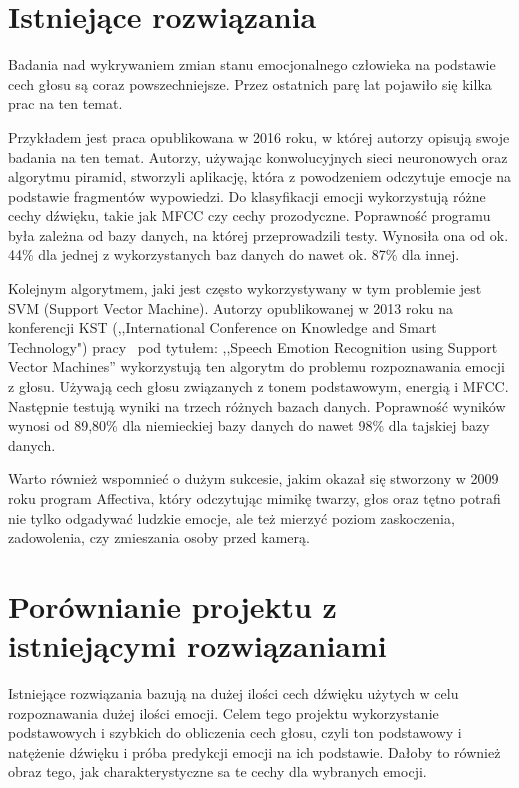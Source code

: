\documentclass[declaration,shortabstract]{iithesis}
\begin{document}
\section{Istniejące rozwiązania}
Badania nad wykrywaniem zmian stanu emocjonalnego człowieka na podstawie cech głosu są coraz powszechniejsze. Przez ostatnich parę lat pojawiło się kilka prac na ten temat. 

Przykładem jest praca\cite{sernn} opublikowana w 2016 roku, w której autorzy opisują swoje badania na ten temat. Autorzy, używając konwolucyjnych sieci neuronowych oraz algorytmu piramid, stworzyli aplikację, która z powodzeniem odczytuje emocje na podstawie fragmentów wypowiedzi. Do klasyfikacji emocji wykorzystują różne cechy dźwięku, takie jak MFCC czy cechy prozodyczne. Poprawność programu była zależna od bazy danych, na której przeprowadzili testy. Wynosiła ona od ok. 44\% dla jednej z wykorzystanych baz danych do nawet ok. 87\% dla innej.

Kolejnym algorytmem, jaki jest często wykorzystywany w tym problemie jest SVM (Support Vector Machine). Autorzy opublikowanej w 2013 roku na konferencji KST (,,International Conference on Knowledge and Smart Technology") pracy~\cite{svn} pod tytułem: ,,Speech Emotion Recognition using Support Vector Machines” wykorzystują ten algorytm do problemu rozpoznawania emocji z głosu. Używają cech głosu związanych z tonem podstawowym, energią i MFCC. Następnie testują wyniki na trzech różnych bazach danych. Poprawność wyników wynosi od 89,80\% dla niemieckiej bazy danych do nawet 98\% dla tajskiej bazy danych.

Warto również wspomnieć o dużym sukcesie, jakim okazał się stworzony w 2009 roku program Affectiva, który odczytując mimikę twarzy, głos oraz tętno potrafi nie tylko odgadywać ludzkie emocje, ale też mierzyć poziom zaskoczenia, zadowolenia, czy zmieszania osoby przed kamerą.

\section{Porównianie projektu z istniejącymi rozwiązaniami}
Istniejące rozwiązania bazują na dużej ilości cech dźwięku użytych w celu rozpoznawania dużej ilości emocji.
Celem tego projektu wykorzystanie podstawowych i szybkich do obliczenia cech głosu, czyli ton podstawowy i natężenie dźwięku i próba predykcji emocji na ich podstawie. Dałoby to również obraz tego, jak charakterystyczne sa te cechy dla wybranych emocji.

\let\cleardoublepage\clearpage
\end{document}
